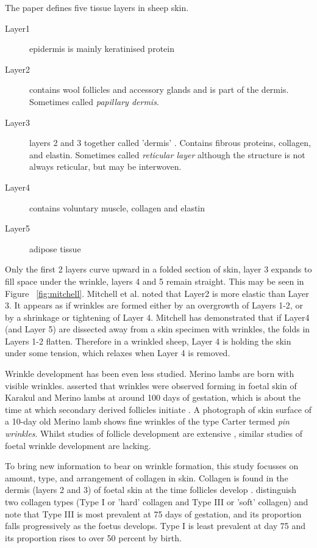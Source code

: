 \documentclass[]{interact}
\theoremstyle{plain}%
\theoremstyle{definition}
\theoremstyle{remark}
\begin{document}
The \citep{mitchell-1984} paper defines five tissue layers in sheep skin.
\begin{description}
\item[Layer1] epidermis is mainly keratinised protein
\item[Layer2] contains wool follicles and accessory glands and is part of the dermis. Sometimes called {\em papillary dermis}.
\item[Layer3] layers 2 and 3 together called 'dermis' . Contains fibrous proteins, collagen, and elastin. Sometimes called {\em reticular layer} although the structure is not always reticular, but may be interwoven.
\item[Layer4] contains voluntary muscle, collagen and elastin
\item[Layer5] adipose tissue
\end{description}


Only the first 2 layers curve upward in a folded section of skin, layer 3 expands to fill space under the wrinkle, layers 4 and 5 remain straight. This may be seen in Figure ~\ref{fig:mitchell}. Mitchell et al. noted that Layer2 is more elastic than Layer 3.  It appears as if wrinkles are formed either by an overgrowth of Layers 1-2, or by a shrinkage or tightening of Layer 4. Mitchell has demonstrated  that if Layer4 (and Layer 5) are dissected away from a skin specimen with wrinkles, the folds in Layers 1-2 flatten.  Therefore in a wrinkled sheep, Layer 4 is holding the skin under some tension, which relaxes when Layer 4 is removed.

Wrinkle development has been even less studied. Merino lambs are born with visible wrinkles.  \citep{bogolyubsky-1940} asserted that wrinkles were observed forming in foetal skin of Karakul and Merino lambs at around 100 days of gestation, which is about the time at which secondary derived follicles initiate \citep{fraser-1960}. A photograph of skin surface of a 10-day old Merino lamb \citep[see]{carter-1943} shows fine wrinkles of the type Carter termed {\em pin wrinkles}. Whilst studies of follicle development are extensive \citep[see]{fraser-1960,ryder-1968,maddocks-1988}, similar studies of foetal wrinkle development are lacking. 

 To bring new information to bear on wrinkle formation, this study focusses on amount, type, and arrangement of collagen in skin. Collagen is found in the dermis (layers 2 and 3) of foetal skin at the time follicles develop \citep{knight-1993}. 
\citeauthor{knight-1993} distinguish two collagen types (Type I or 'hard' collagen and Type III or 'soft' collagen) and note  that Type III is most prevalent at 75 days of gestation, and its proportion falls progressively as the foetus develops. Type I is least prevalent at day 75 and its proportion rises to over 50 percent by birth.
\end{document}
